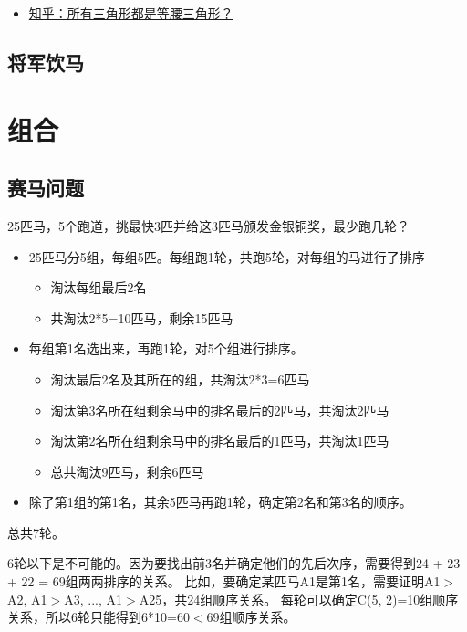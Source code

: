 \documentclass[export, 12pt, letterpaper]{ctexrep}
\begin{document}
\begin{itemize}
\item{ \href{https://www.zhihu.com/question/34781603/answer/59948789}{知乎：所有三角形都是等腰三角形？} }
\end{itemize}



\section{将军饮马}




\chapter{组合}


\section{赛马问题}
25匹马，5个跑道，挑最快3匹并给这3匹马颁发金银铜奖，最少跑几轮？


\begin{itemize}
\item{ 25匹马分5组，每组5匹。每组跑1轮，共跑5轮，对每组的马进行了排序
\begin{itemize}
\item{ 淘汰每组最后2名 }
\item{ 共淘汰2*5=10匹马，剩余15匹马 }
\end{itemize}
 }
\item{ 每组第1名选出来，再跑1轮，对5个组进行排序。
\begin{itemize}
\item{ 淘汰最后2名及其所在的组，共淘汰2*3=6匹马 }
\item{ 淘汰第3名所在组剩余马中的排名最后的2匹马，共淘汰2匹马 }
\item{ 淘汰第2名所在组剩余马中的排名最后的1匹马，共淘汰1匹马 }
\item{ 总共淘汰9匹马，剩余6匹马 }
\end{itemize}
 }
\item{ 除了第1组的第1名，其余5匹马再跑1轮，确定第2名和第3名的顺序。 }
\end{itemize}


总共7轮。

6轮以下是不可能的。因为要找出前3名并确定他们的先后次序，需要得到24 + 23 + 22 = 69组两两排序的关系。
比如，要确定某匹马A1是第1名，需要证明A1$>$A2, A1$>$A3, ..., A1$>$A25，共24组顺序关系。
每轮可以确定C(5, 2)=10组顺序关系，所以6轮只能得到6*10=60$<$69组顺序关系。
\end{document}
